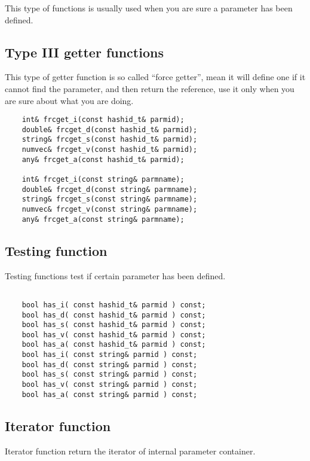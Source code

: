 \documentclass[letterpaper]{book}
\begin{document}
  This type of functions is usually used when you are sure a parameter has been defined.

\subsection{Type III getter functions}
  This type of getter function is so called ``force getter'', mean it will define one if it cannot find the parameter,
and then return the reference, use it only when you are sure about what you are doing.

\begin{lstlisting}
    int& frcget_i(const hashid_t& parmid);
    double& frcget_d(const hashid_t& parmid);
    string& frcget_s(const hashid_t& parmid);
    numvec& frcget_v(const hashid_t& parmid);
    any& frcget_a(const hashid_t& parmid); 

    int& frcget_i(const string& parmname);
    double& frcget_d(const string& parmname);
    string& frcget_s(const string& parmname);
    numvec& frcget_v(const string& parmname);
    any& frcget_a(const string& parmname); 

\end{lstlisting}

\subsection{Testing function}
  Testing functions test if certain parameter has been defined.
\begin{lstlisting}

    bool has_i( const hashid_t& parmid ) const; 
    bool has_d( const hashid_t& parmid ) const; 
    bool has_s( const hashid_t& parmid ) const; 
    bool has_v( const hashid_t& parmid ) const; 
    bool has_a( const hashid_t& parmid ) const; 
    bool has_i( const string& parmid ) const; 
    bool has_d( const string& parmid ) const; 
    bool has_s( const string& parmid ) const; 
    bool has_v( const string& parmid ) const; 
    bool has_a( const string& parmid ) const; 

\end{lstlisting}

\subsection{Iterator function}

    Iterator function return the iterator of internal parameter container.
\end{document}
